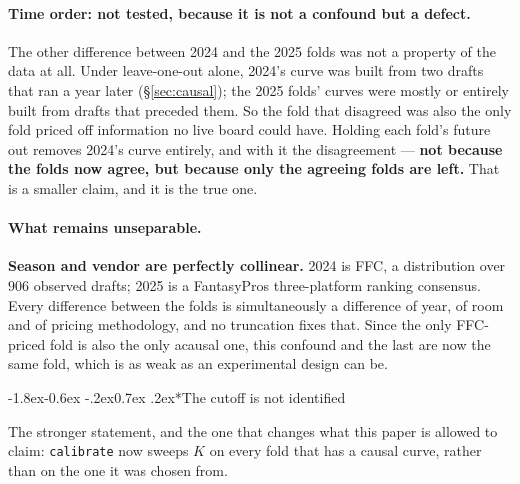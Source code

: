 \documentclass[10pt,a4paper]{article}
\makeatletter
\theoremstyle{plain}
\theoremstyle{definition}
\theoremstyle{remark}
\newcommand{\code}[1]{\texttt{\small #1}}
\renewcommand\subsubsection{\@startsection{subsubsection}{3}{\z@}%
  {-1.8ex\@plus -0.6ex \@minus -.2ex}{0.7ex \@plus .2ex}{\normalfont\normalsize\bfseries}}
\makeatother
\begin{document}
\paragraph{Time order: not tested, because it is not a confound but a defect.} The other
difference between 2024 and the 2025 folds was not a property of the data at all. Under
leave-one-out alone, 2024's curve was built from two drafts that ran a year later
(\S\ref{sec:causal}); the 2025 folds' curves were mostly or entirely built from drafts that
preceded them. So the fold that disagreed was also the only fold priced off information no
live board could have. Holding each fold's future out removes 2024's curve entirely, and
with it the disagreement --- \textbf{not because the folds now agree, but because only the
agreeing folds are left.} That is a smaller claim, and it is the true one.

\paragraph{What remains unseparable.} \textbf{Season and vendor are perfectly collinear.}
2024 is FFC, a distribution over $906$ observed drafts; 2025 is a FantasyPros
three-platform ranking consensus. Every difference between the folds is simultaneously a
difference of year, of room and of pricing methodology, and no truncation fixes that. Since
the only FFC-priced fold is also the only acausal one, this confound and the last are now
the same fold, which is as weak as an experimental design can be.

\subsubsection*{The cutoff is not identified}

The stronger statement, and the one that changes what this paper is allowed to claim:
\code{calibrate} now sweeps $K$ on every fold that has a causal curve, rather than on the
one it was chosen from.
\end{document}
